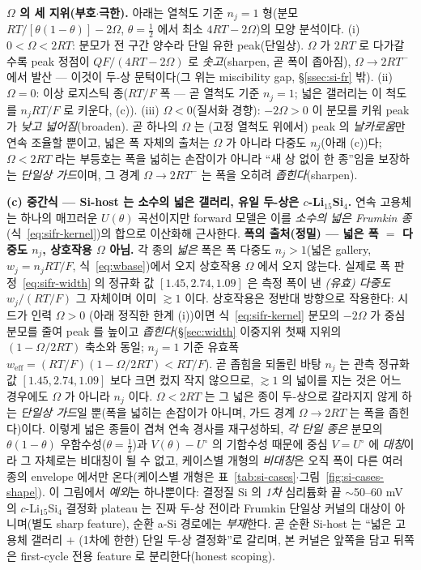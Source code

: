 \begin{signbox}
\textbf{$\Omega$ 의 세 지위(부호$\cdot$극한).} 아래는 열척도 기준 $n_j{=}1$ 형(분모 $RT/[\theta(1-\theta)]-2\Omega$,
$\theta{=}\tfrac12$ 에서 최소 $4RT-2\Omega$)의 모양 분석이다. (i) $0<\Omega<2RT$: 분모가 전 구간 양수라 단일 유한
peak(단일상). $\Omega$ 가 $2RT$ 로 다가갈수록 peak 정점이 $Q F/(4RT-2\Omega)$ 로 \emph{솟고}(sharpen, 곧 폭이
좁아짐), $\Omega{\to}2RT^-$ 에서 발산 --- 이것이 두-상 문턱이다(그 위는 miscibility gap, \S\ref{ssec:si-fr} 밖). (ii)
$\Omega{=}0$: 이상 로지스틱 종($RT/F$ 폭 --- 곧 열척도 기준 $n_j{=}1$; 넓은 갤러리는 이 척도를 $n_jRT/F$ 로 키운다,
(c)). (iii) $\Omega<0$(질서화 경향): $-2\Omega>0$ 이 분모를 키워 peak 가 \emph{낮고 넓어짐}(broaden). 곧 하나의 $\Omega$
는 (고정 열척도 위에서) peak 의 \emph{날카로움}만 연속 조율할 뿐이고, 넓은 폭 자체의 출처는 $\Omega$ 가 아니라
다중도 $n_j$(아래 (c))다; $\Omega<2RT$ 라는 부등호는 폭을 넓히는 손잡이가 아니라 ``새 상 없이 한 종''임을 보장하는
\emph{단일상 가드}이며, 그 경계 $\Omega{\to}2RT^-$ 는 폭을 오히려 \emph{좁힌다}(sharpen).
\end{signbox}

\textbf{(c) 중간식 --- Si-host 는 소수의 넓은 갤러리, 유일 두-상은 $c$-Li$_{15}$Si$_4$.} 연속 고용체는 하나의
매끄러운 $U(\theta)$ 곡선이지만 forward 모델은 이를 \emph{소수의 넓은 Frumkin 종}(식~\eqref{eq:sifr-kernel})의
합으로 이산화해 근사한다. \textbf{폭의 출처(정밀) --- 넓은 폭 $=$ 다중도 $n_j$, 상호작용 $\Omega$ 아님.} 각 종의
\emph{넓은} 폭은 폭 다중도 $n_j{>}1$(넓은 gallery, $w_j{=}n_jRT/F$, 식~\eqref{eq:wbase})에서 오지 상호작용 $\Omega$
에서 오지 않는다. 실제로 폭 판정~\eqref{eq:sifr-width} 의 정규화 값 $[1.45,2.74,1.09]$ 은 측정 폭이 낸 \emph{(유효)
다중도} $w_j/(RT/F)$ 그 자체이며 이미 $\gtrsim1$ 이다. 상호작용은 정반대 방향으로 작용한다: 시드가 인력 $\Omega{>}0$
(아래 정직한 한계 (i))이면 식~\eqref{eq:sifr-kernel} 분모의 $-2\Omega$ 가 중심 분모를 줄여 peak 를 높이고
\emph{좁힌다}(\S\ref{sec:width} 이중지위 첫째 지위의 $(1-\Omega/2RT)$ 축소와 동일; $n_j{=}1$ 기준 유효폭
$w_\mathrm{eff}{=}(RT/F)(1-\Omega/2RT)<RT/F$). 곧 좁힘을 되돌린 바탕 $n_j$ 는 관측 정규화 값 $[1.45,2.74,1.09]$ 보다
크면 컸지 작지 않으므로, $\gtrsim1$ 의 넓이를 지는 것은 어느 경우에도 $\Omega$ 가 아니라 $n_j$ 이다. $\Omega<2RT$ 는
그 넓은 종이 두-상으로 갈라지지 않게 하는 \emph{단일상 가드}일 뿐(폭을 넓히는 손잡이가 아니며, 가드 경계
$\Omega{\to}2RT$ 는 폭을 좁힌다)이다. 이렇게 넓은 종들이 겹쳐 연속 경사를 재구성하되, \emph{각 단일 종은} 분모의
$\theta(1-\theta)$ 우함수성($\theta{=}\tfrac12$)과 $V(\theta){-}U^\circ$ 의 기함수성 때문에 중심 $V{=}U^\circ$ 에
\emph{대칭}이라 그 자체로는 비대칭이 될 수 없고, 케이스별 개형의 \emph{비대칭}은 오직 폭이 다른 여러 종의 envelope
에서만 온다(케이스별 개형은 표~\ref{tab:si-cases}$\cdot$그림~\ref{fig:si-cases-shape}). 이 그림에서 \emph{예외}는
하나뿐이다: 결정질 Si 의 \emph{1차} 심리튬화 끝 $\sim$50--60 mV 의 $c$-Li$_{15}$Si$_4$ 결정화 plateau 는 진짜 두-상
전이라\cite{obrovac_christensen2004,ogata_nmr2014} Frumkin 단일상 커널의 대상이 아니며(별도 sharp feature), 순환
a-Si 경로에는 \emph{부재}한다\cite{chevrier_dahn2009}. 곧 순환 Si-host 는 ``넓은 고용체 갤러리 $+$ (1차에 한한)
단일 두-상 결정화''로 갈리며, 본 커널은 앞쪽을 담고 뒤쪽은 first-cycle 전용 feature 로 분리한다(honest scoping).


